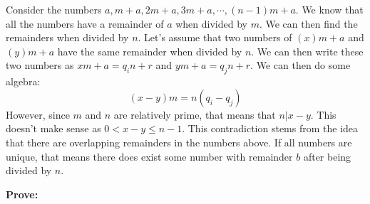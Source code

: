 \documentclass[12pt]{article}
\begin{document}
Consider the numbers $a, m + a, 2m + a, 3m+a, \cdots, (n-1)m + a$. We know that all the numbers 
have a remainder of $a$ when divided by $m$. We can then find the remainders when divided by $n$. Let's assume 
that two numbers of $(x)m + a$ and $(y)m + a$ have the same remainder when divided by $n$.
We can then write these two numbers as $xm + a = q_{i}n + r$ and $ym + a = q_{j}n + r$. 
We can then do some algebra: 
$$(x-y)m = n(q_i-q_j)$$
However, since $m$ and $n$ are relatively prime, that means that $n|x-y$. This doesn't make sense
as $0 < x-y \le n-1$. This contradiction stems from the idea that there are overlapping remainders in 
the numbers above. If all numbers are unique, that means there does exist some number with remainder
$b$ after being divided by $n$.

\noindent
\textbf{Prove:}
\end{document}
